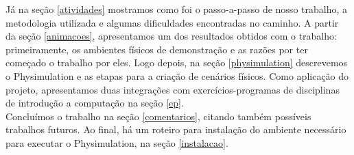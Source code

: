 Já na seção \ref{atividades} mostramos como foi o passo-a-passo de nosso trabalho, a metodologia utilizada e algumas dificuldades encontradas no caminho. A partir da seção \ref{animacoes}, apresentamos um dos resultados obtidos com o trabalho: primeiramente, os ambientes físicos de demonstração e as razões por ter começado o trabalho por eles. Logo depois, na seção \ref{physimulation} descrevemos o Physimulation e as etapas para a criação de cenários físicos. Como aplicação do projeto, apresentamos duas integrações com exercícios-programas de disciplinas de introdução a computação na seção \ref{ep}. \\

Concluímos o trabalho na seção \ref{comentarios}, citando também possíveis trabalhos futuros. Ao final, há um roteiro para instalação do ambiente necessário para executar o Physimulation, na seção \ref{instalacao}. 


